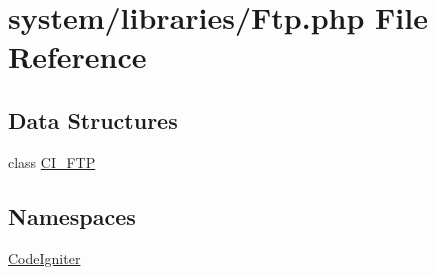 \hypertarget{_ftp_8php}{\section{system/libraries/\-Ftp.php File Reference}
\label{_ftp_8php}
}
\subsection*{Data Structures}
\begin{DoxyCompactItemize}
\item 
class \hyperlink{class_c_i___f_t_p}{C\-I\-\_\-\-F\-T\-P}
\end{DoxyCompactItemize}
\subsection*{Namespaces}
\begin{DoxyCompactItemize}
\item 
\hyperlink{namespace_code_igniter}{Code\-Igniter}
\end{DoxyCompactItemize}

